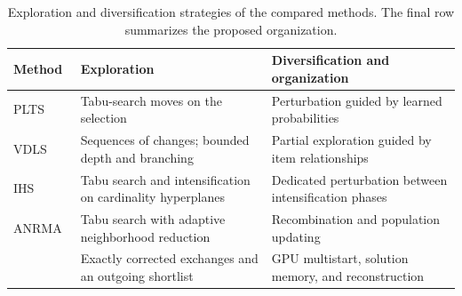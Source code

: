 \begin{table}[tbp]
\centering\small
\setlength{\tabcolsep}{4pt}
\raggedright
\renewcommand{\arraystretch}{1.15}

\caption{Exploration and diversification strategies of the compared methods. The final row summarizes the proposed organization.}
\label{tab:method-context}
\begin{tabular}{p{.16\linewidth}p{.35\linewidth}p{.38\linewidth}}
\toprule
Method & Exploration & Diversification and organization\\
\midrule
PLTS~\cite{Li2021PLTS} & Tabu-search moves on the selection & Perturbation guided by learned probabilities\\
VDLS~\cite{Zhou2022VDLS} & Sequences of changes; bounded depth and branching & Partial exploration guided by item relationships\\
IHS~\cite{Wei2023IHS} & Tabu search and intensification on cardinality hyperplanes & Dedicated perturbation between intensification phases\\
ANRMA~\cite{Wei2026ANRMA} & Tabu search with adaptive neighborhood reduction & Recombination and population updating\\
\method{} & Exactly corrected exchanges and an outgoing shortlist & GPU multistart, solution memory, and reconstruction\\
\bottomrule
\end{tabular}

\end{table}
